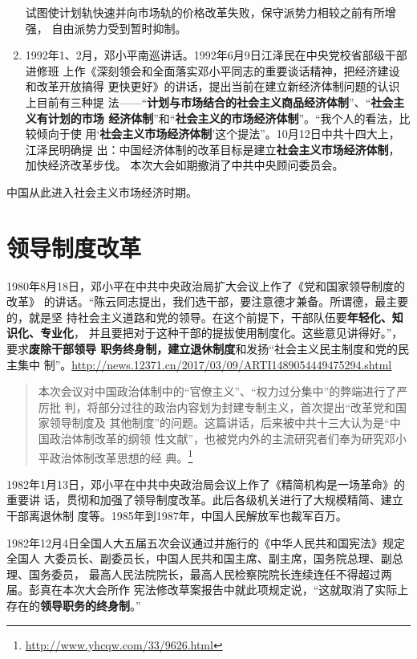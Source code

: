 \begin{enumerate}
  试图使计划轨快速并向市场轨的价格改革失败，保守派势力相较之前有所增强，
  自由派势力受到暂时抑制。

\item 1992年1、2月，邓小平南巡讲话。1992年6月9日江泽民在中央党校省部级干部进修班
  上作《深刻领会和全面落实邓小平同志的重要谈话精神，把经济建设和改革开放搞得
  更快更好》的讲话，提出当前在建立新经济体制问题的认识上目前有三种提
  法——“\textbf{计划与市场结合的社会主义商品经济体制}”、“\textbf{社会主义有计划的市场
    经济体制}”和“\textbf{社会主义的市场经济体制}”。“我个人的看法，比较倾向于使
  用‘\textbf{社会主义市场经济体制}’这个提法”。10月12日中共十四大上，江泽民明确提
  出：中国经济体制的改革目标是建立\textbf{社会主义市场经济体制}，加快经济改革步伐。
  本次大会如期撤消了中共中央顾问委员会。
\end{enumerate}

中国从此进入社会主义市场经济时期。

\section{领导制度改革}

1980年8月18日，邓小平在中共中央政治局扩大会议上作了《党和国家领导制度的改革》
的讲话。“陈云同志提出，我们选干部，要注意德才兼备。所谓德，最主要的，就是坚
持社会主义道路和党的领导。在这个前提下，干部队伍要\textbf{年轻化、知识化、专业化}，
并且要把对于这种干部的提拔使用制度化。这些意见讲得好。”，要求\textbf{废除干部领导
  职务终身制，建立退休制度}和发扬“社会主义民主制度和党的民主集中
制”。\url{http://news.12371.cn/2017/03/09/ARTI1489054449475294.shtml}
\begin{quotation}
  本次会议对中国政治体制中的“官僚主义”、“权力过分集中”的弊端进行了严厉批
  判，将部分过往的政治内容划为封建专制主义，首次提出“改革党和国家领导制度及
  其他制度”的问题。这篇讲话，后来被中共十三大认为是“中国政治体制改革的纲领
  性文献”，也被党内外的主流研究者们奉为研究邓小平政治体制改革思想的经
  典。\footnote{\url{http://www.yhcqw.com/33/9626.html}}
\end{quotation}

1982年1月13日，邓小平在中共中央政治局会议上作了《精简机构是一场革命》的重要讲
话，贯彻和加强了领导制度改革。此后各级机关进行了大规模精简、建立干部离退休制
度等。1985年到1987年，中国人民解放军也裁军百万。

1982年12月4日全国人大五届五次会议通过并施行的《中华人民共和国宪法》规定全国人
大委员长、副委员长，中国人民共和国主席、副主席，国务院总理、副总理、国务委员，
最高人民法院院长，最高人民检察院院长连续连任不得超过两届。彭真在本次大会所作
宪法修改草案报告中就此项规定说，“这就取消了实际上存在的\textbf{领导职务的终身制}。”


